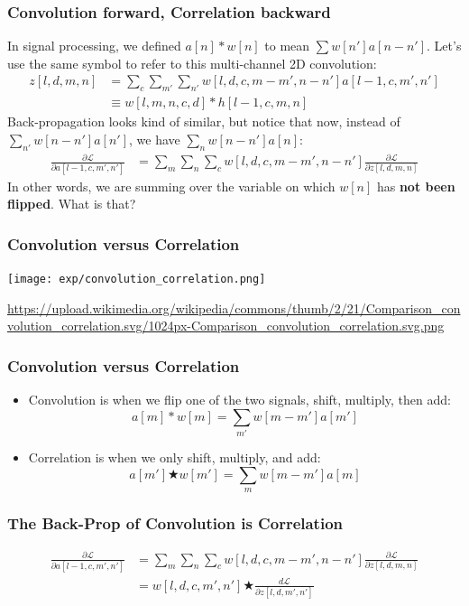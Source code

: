 \documentclass{beamer}
\begin{document}
\begin{frame}
  \frametitle{Convolution forward, Correlation backward}

  In signal processing, we defined $a[n]\ast w[n]$ to mean $\sum
  w[n']a[n-n']$.  Let's use the same symbol to refer to this
  multi-channel 2D convolution:
  \begin{align*}
    z[l,d,m,n] &= \sum_c\sum_{m'}\sum_{n'} w[l,d,c,m-m',n-n']a[l-1,c,m',n']\\
    &\equiv w[l,m,n,c,d] \ast h[l-1,c,m,n]
  \end{align*}
  Back-propagation looks kind of similar, but notice that now, instead
  of $\sum_{n'}w[n-n']a[n']$, we have $\sum_nw[n-n']a[n]$:
  \begin{align*}
    \frac{\partial{\mathcal L}}{\partial a[l-1,c,m',n']} &=
    \sum_{m}\sum_{n}\sum_c w[l,d,c,m-m',n-n']\frac{\partial{\mathcal L}}{\partial z[l,d,m,n]}
  \end{align*}
  In other words, we are summing over the variable on which $w[n]$ has
  {\bf not been flipped}.  What is that?
\end{frame}

\begin{frame}
  \frametitle{Convolution versus Correlation}
  \centerline{\texttt{[image: exp/convolution\_correlation.png]}}
  \url{https://upload.wikimedia.org/wikipedia/commons/thumb/2/21/Comparison_convolution_correlation.svg/1024px-Comparison_convolution_correlation.svg.png}
\end{frame}

\begin{frame}
  \frametitle{Convolution versus Correlation}
  \begin{itemize}
  \item Convolution is when we flip one of the two signals, shift, multiply, then add:
    \begin{displaymath}
      a[m]\ast w[m] = \sum_{m'} w[m-m']a[m']
    \end{displaymath}
  \item Correlation is when we only shift, multiply, and add:
    \begin{displaymath}
      a[m']\bigstar w[m'] = \sum_m w[m-m']a[m]
    \end{displaymath}
  \end{itemize}
\end{frame}

\begin{frame}
  \frametitle{The Back-Prop of Convolution is Correlation}

  \begin{align*}
    \frac{\partial{\mathcal L}}{\partial a[l-1,c,m',n']} &=
    \sum_{m}\sum_{n}\sum_c w[l,d,c,m-m',n-n']\frac{\partial{\mathcal L}}{\partial z[l,d,m,n]}\\
    &= w[l,d,c,m',n'] \bigstar \frac{d{\mathcal L}}{\partial z[l,d,m',n']}
  \end{align*}
\end{frame}
\end{document}
